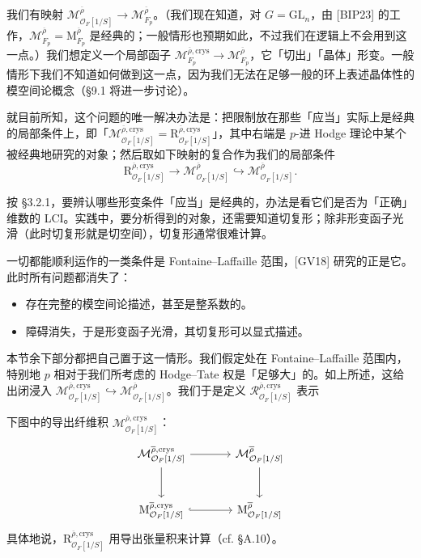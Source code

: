 我们有映射 $\mathcal M^{\overline\rho}_{\mathcal O_F[1/S]}\to\mathcal M^{\overline\rho}_{F_p}$。（我们现在知道，对 $G=\mathrm{GL}_n$，由 [BIP23] 的工作，$\mathcal M^{\overline\rho}_{F_p}=\mathrm M^{\overline\rho}_{F_p}$ 是经典的；一般情形也预期如此，不过我们在逻辑上不会用到这一点。）我们想定义一个局部函子 $\mathcal M^{\overline\rho,\mathrm{crys}}_{F_p}\to\mathcal M^{\overline\rho}_{F_p}$，它「切出」「晶体」形变。一般情形下我们不知道如何做到这一点，因为我们无法在足够一般的环上表述晶体性的模空间论概念（§9.1 将进一步讨论）。

就目前所知，这个问题的唯一解决办法是：把限制放在那些「应当」实际上是经典的局部条件上，即「$\mathcal M^{\overline\rho,\mathrm{crys}}_{\mathcal O_F[1/S]}=\mathrm R^{\overline\rho,\mathrm{crys}}_{\mathcal O_F[1/S]}$」，其中右端是 $p$-进 Hodge 理论中某个被经典地研究的对象；然后取如下映射的复合作为我们的局部条件
\[
\mathrm R^{\overline\rho,\mathrm{crys}}_{\mathcal O_F[1/S]}\to\mathcal M^{\overline\rho}_{\mathcal O_F[1/S]}\hookrightarrow\mathcal M^{\overline\rho}_{\mathcal O_F[1/S]}.
\]

按 §3.2.1，要辨认哪些形变条件「应当」是经典的，办法是看它们是否为「正确」维数的 LCI。实践中，要分析得到的对象，还需要知道切复形；除非形变函子光滑（此时切复形就是切空间），切复形通常很难计算。

一切都能顺利运作的一类条件是 Fontaine--Laffaille 范围，[GV18] 研究的正是它。此时所有问题都消失了：
\begin{itemize}[leftmargin=1.4em]
\item 存在完整的模空间论描述，甚至是整系数的。
\item 障碍消失，于是形变函子光滑，其切复形可以显式描述。
\end{itemize}
本节余下部分都把自己置于这一情形。我们假定处在 Fontaine--Laffaille 范围内，特别地 $p$ 相对于我们所考虑的 Hodge--Tate 权是「足够大」的。如上所述，这给出闭浸入 $\mathcal M^{\overline\rho,\mathrm{crys}}_{\mathcal O_F[1/S]}\hookrightarrow\mathcal M^{\overline\rho}_{\mathcal O_F[1/S]}$。我们于是定义 $\mathcal R^{\overline\rho,\mathrm{crys}}_{\mathcal O_F[1/S]}$ 表示

下图中的导出纤维积 $\mathcal M^{\overline\rho,\mathrm{crys}}_{\mathcal O_F[1/S]}$：
\[
\begin{tikzcd}[column sep=large, row sep=large]
\mathcal M^{\overline\rho,\mathrm{crys}}_{\mathcal O_F[1/S]}\arrow[r]\arrow[d] & \mathcal M^{\overline\rho}_{\mathcal O_F[1/S]}\arrow[d]\\
\mathrm M^{\overline\rho,\mathrm{crys}}_{\mathcal O_F[1/S]}\arrow[r, hook] & \mathrm M^{\overline\rho}_{\mathcal O_F[1/S]}
\end{tikzcd}
\]
具体地说，$\mathrm R^{\overline\rho,\mathrm{crys}}_{\mathcal O_F[1/S]}$ 用导出张量积来计算（cf. §A.10）。


